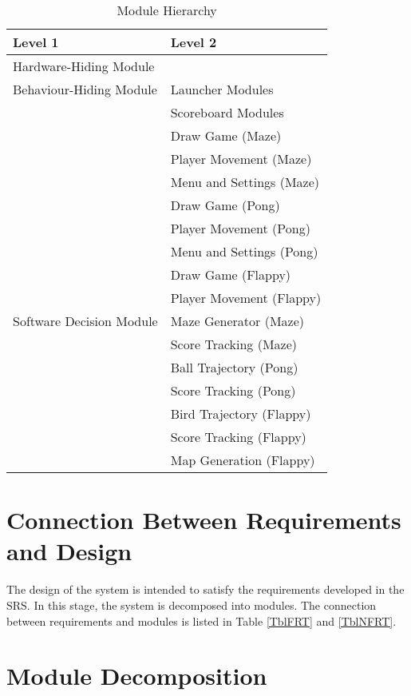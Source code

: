 \documentclass[12pt, titlepage]{article}
\begin{document}
\begin{table}[!htbp]
\centering
\begin{tabular}{p{} p{}}
\toprule
\textbf{Level 1} & \textbf{Level 2}\\
\midrule

{Hardware-Hiding Module} & ~ \\
\midrule

\multirow{1}{0.3\textwidth}{Behaviour-Hiding Module}
& Launcher Modules\\
& Scoreboard Modules\\
& Draw Game (Maze)\\
& Player Movement (Maze)\\
& Menu and Settings (Maze)\\ 
& Draw Game (Pong)\\
& Player Movement (Pong)\\
& Menu and Settings (Pong)\\ 
& Draw Game (Flappy)\\
& Player Movement (Flappy) \\

\midrule

  \multirow{1}{0.3\textwidth}{Software Decision Module}
& Maze Generator (Maze)\\
& Score Tracking (Maze)\\ 
& Ball Trajectory (Pong)\\
& Score Tracking (Pong) \\ 
& Bird Trajectory (Flappy)\\
& Score Tracking (Flappy)\\
& Map Generation (Flappy)\\
\bottomrule

\end{tabular}
\caption{Module Hierarchy}
\label{TblMH}
\end{table}

\section{Connection Between Requirements and Design} \label{SecConnection}

The design of the system is intended to satisfy the requirements developed in
the SRS. In this stage, the system is decomposed into modules. The connection
between requirements and modules is listed in Table \ref{TblFRT} and \ref{TblNFRT}.

\section{Module Decomposition} \label{SecMD}
\end{document}
